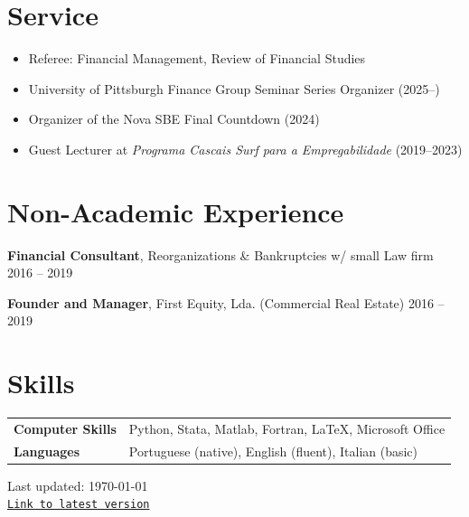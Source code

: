 \documentclass[letterpaper]{article}
\def\footerlink{https://miguelcfoliveira.github.io/CV/CV.pdf}
\newenvironment{itemize*}{
  \begin{list}{}{
    \setlength{\leftmargin}{1.5em}
  }
}{
  \end{list}
}
\begin{document}
\section*{Service}
\vspace{-0.2in}
\hrulefill
\begin{itemize}
\item Referee: Financial Management, Review of Financial Studies
\item University of Pittsburgh Finance Group Seminar Series Organizer (2025--)
\item Organizer of the Nova SBE Final Countdown (2024)
\item Guest Lecturer at \textit{Programa Cascais Surf para a Empregabilidade} (2019--2023)
\end{itemize}

\section*{Non-Academic Experience}
\vspace{-0.2in}
\hrulefill

\begin{itemize*}
\item \textbf{Financial Consultant}, Reorganizations \& Bankruptcies w/ small Law firm \hfill 2016 -- 2019
\item \textbf{Founder and Manager}, First Equity, Lda. (Commercial Real Estate) \hfill 2016 -- 2019
\end{itemize*}

\section*{Skills}
\vspace{-0.2in}
\hrulefill
\renewcommand{\arraystretch}{1.25}
\begin{table}[h]
 \vspace*{-\baselineskip}
 \hspace{0.1in}
\begin{tabular}{l l}
\textbf{Computer Skills} & Python, Stata, Matlab, Fortran, \LaTeX, Microsoft Office \\
\textbf{Languages} & Portuguese (native), English (fluent), Italian (basic)
\end{tabular}
\end{table}


\begin{center}
  \begin{footnotesize}
    Last updated: \today \\
    \href{\footerlink}{\texttt{Link to latest version}}
  \end{footnotesize}
\end{center}
\end{document}
